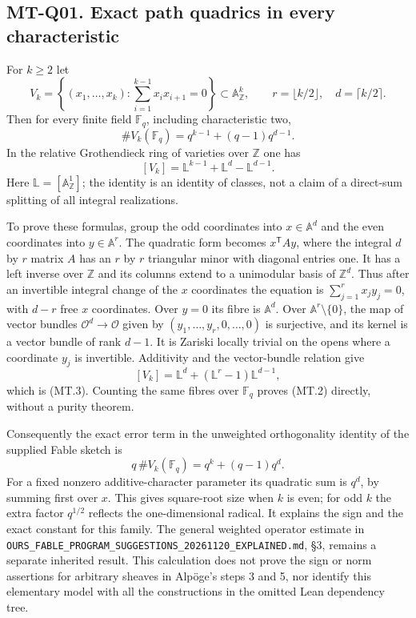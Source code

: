 \subsection*{MT-Q01. Exact path quadrics in every characteristic}
For $k\ge2$ let
\[
 V_k=\left\{(x_1,\ldots,x_k):\sum_{i=1}^{k-1}x_ix_{i+1}=0\right\}
       \subset\mathbb A^k_{\mathbb Z},\qquad
 r=\lfloor k/2\rfloor,\quad d=\lceil k/2\rceil.
\]
Then for every finite field $\mathbb F_q$, including characteristic two,
\[
 \#V_k(\mathbb F_q)=q^{k-1}+(q-1)q^{d-1}.                 \tag{MT.2}
\]
In the relative Grothendieck ring of varieties over $\mathbb Z$ one has
\[
                 [V_k]=\mathbb L^{k-1}+\mathbb L^d-\mathbb L^{d-1}.
                                                               \tag{MT.3}
\]
Here $\mathbb L=[\mathbb A^1_{\mathbb Z}]$; the identity is an identity of
classes, not a claim of a direct-sum splitting of all integral realizations.

To prove these formulas, group the odd coordinates into $x\in\mathbb A^d$
and the even coordinates into $y\in\mathbb A^r$.  The quadratic form
becomes $x^{\mathsf T}Ay$, where the integral $d$ by $r$ matrix $A$ has an
$r$ by $r$ triangular minor with diagonal entries one.  It has a left
inverse over $\mathbb Z$ and its columns extend to a unimodular basis of
$\mathbb Z^d$.  Thus after an invertible integral change of the $x$
coordinates the equation is $\sum_{j=1}^r x_jy_j=0$, with $d-r$ free
$x$ coordinates.  Over $y=0$ its fibre is $\mathbb A^d$.  Over
$\mathbb A^r\setminus\{0\}$, the map of vector bundles
$\mathcal O^d\to\mathcal O$ given by $(y_1,\ldots,y_r,0,\ldots,0)$ is
surjective, and its kernel is a vector bundle of rank $d-1$.
It is Zariski locally trivial on the opens where a coordinate $y_j$ is
invertible.  Additivity and the vector-bundle relation give
\[
 [V_k]=\mathbb L^d+(\mathbb L^r-1)\mathbb L^{d-1},
\]
which is (MT.3).  Counting the same fibres over $\mathbb F_q$ proves
(MT.2) directly, without a purity theorem.

Consequently the exact error term in the unweighted orthogonality identity
of the supplied Fable sketch is
\[
             q\,\#V_k(\mathbb F_q)=q^k+(q-1)q^d.
\]
For a fixed nonzero additive-character parameter its quadratic sum is
$q^d$, by summing first over $x$.  This gives square-root size when $k$ is
even; for odd $k$ the extra factor $q^{1/2}$ reflects the one-dimensional
radical.  It explains the sign and the exact constant for this family.
The general weighted operator estimate in
\texttt{OURS\_FABLE\_PROGRAM\_SUGGESTIONS\_20261120\_EXPLAINED.md},
\S3, remains a separate inherited result.  This calculation does not prove
the sign or norm assertions for arbitrary sheaves in Alp\"oge's steps 3
and 5, nor identify this elementary model with all the constructions in
the omitted Lean dependency tree.

